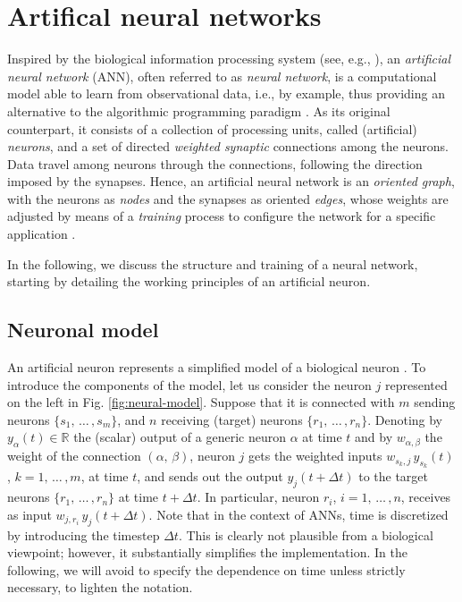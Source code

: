 \documentclass[longtitle]{elsarticle}
\numberwithin{equation}{section}
\theoremstyle{theorem}
\theoremstyle{definition}
\theoremstyle{remark}
\theoremstyle{proposition}
\numberwithin{figure}{section}
\begin{document}
	\section{Artifical neural networks}
	\label{section:Artificial neural networks}
	
		Inspired by the biological information processing system (see, e.g., \cite{Hay05, Kri07}), an \emph{artificial neural network} (ANN), often referred to as \emph{neural network}, is a computational model able to learn from observational data, i.e., by example, thus providing an alternative to the algorithmic programming paradigm \cite{Nie15}. As its original counterpart, it consists of a collection of processing units, called (artificial) \emph{neurons}, and a set of directed \emph{weighted synaptic} connections among the neurons. Data travel among neurons through the connections, following the direction imposed by the synapses. Hence, an artificial neural network is an \emph{oriented graph}, with the neurons as \emph{nodes} and the synapses as oriented \emph{edges}, whose weights are adjusted by means of a \emph{training} process to configure the network for a specific application \cite{SD13}. 
		
		In the following, we discuss the structure and training of a neural network, starting by detailing the working principles of an artificial neuron.  
		
				
											
	\subsection{Neuronal model}
	\label{section:Neuronal model}
	
		An artificial neuron represents a simplified model of a biological neuron \cite{Kri07}. To introduce the components of the model, let us consider the neuron $j$ represented on the left in Fig. \ref{fig:neural-model}. Suppose that it is connected with $m$ sending neurons $\big\lbrace s_1, \, \ldots \, , s_m \big\rbrace$, and $n$ receiving (target) neurons $\big\lbrace r_1, \, \ldots \, , r_n \big\rbrace$. Denoting by $y_{\alpha}(t) \in \mathbb{R}$ the (scalar) output of a generic neuron $\alpha$ at time $t$ and by $w_{\alpha,\beta}$ the weight of the connection $(\alpha, \, \beta)$, neuron $j$ gets the weighted inputs $w_{s_k,j} \, y_{s_k}(t)$, $k = 1, \, \ldots \, , m$, at time $t$, and sends out the output $y_j(t + \Delta t)$ to the target neurons $\big\lbrace r_1, \, \ldots \, , r_n \big\rbrace$ at time $t + \Delta t$. In particular, neuron $r_i$, $i = 1, \, \ldots \, , n$, receives as input $w_{j,r_i} \, y_j(t + \Delta t)$. Note that in the context of ANNs, time is discretized by introducing the timestep $\Delta t$. This is clearly not plausible from a biological viewpoint; however, it substantially simplifies the implementation. In the following, we will avoid to specify the dependence on time unless strictly necessary, to lighten the notation.
		
\end{document}
